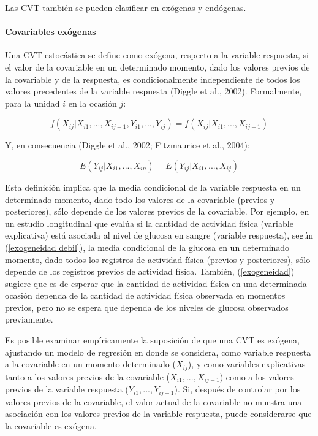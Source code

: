 \documentclass[spanish]{article}
\numberwithin{figure}{subsection}
\numberwithin{equation}{subsection}
\numberwithin{table}{subsection}
\begin{document}
Las CVT también se pueden clasificar en exógenas y endógenas.

\paragraph{Covariables exógenas} \mbox{}

Una CVT estocástica se define como exógena, respecto a la variable respuesta, si
el valor de la covariable en un determinado momento, dado los valores previos de
la covariable y de la respuesta, es condicionalmente independiente de todos los
valores precedentes de la variable respuesta (Diggle et al., 2002). Formalmente,
para la unidad $i$ en la ocasión $j$:  

\begin{equation}
	\label{exogeneidad}
	f(X_{ij}|X_{i1}, ..., X_{ij-1}, Y_{i1}, ..., Y_{ij}) =
	f(X_{ij}|X_{i1}, ..., X_{ij-1})
\end{equation}

Y, en consecuencia (Diggle et al., 2002; Fitzmaurice et al., 2004):

\begin{equation}
	\label{exogeneidad debil}
	E(Y_{ij}|X_{i1}, ..., X_{in}) = E(Y_{ij}|X_{i1}, ..., X_{ij})
\end{equation}

Esta definición implica que la media condicional de la variable respuesta en un
determinado momento, dado todo los valores de la covariable (previos y
posteriores), sólo depende de los valores previos de la covariable. Por ejemplo,
en un estudio longitudinal que evalúa si la cantidad de actividad física
(variable explicativa) está asociada al nivel de glucosa en sangre (variable
respuesta), según (\ref{exogeneidad debil}), la media condicional de la glucosa
en un determinado momento, dado todos los registros de actividad física (previos
y posteriores), sólo depende de los registros previos de actividad física.
También, (\ref{exogeneidad}) sugiere que es de esperar que la cantidad de
actividad física en una determinada ocasión dependa de la cantidad de actividad
física observada en momentos previos, pero no se espera que dependa de los niveles
de glucosa observados previamente.

Es posible examinar empíricamente la suposición de que una CVT es exógena,
ajustando un modelo de regresión en donde se considera, como variable respuesta
a la covariable en un momento determinado ($X_{ij}$), y como variables
explicativas tanto a los valores previos de la covariable ($X_{i1}, ...,
X_{ij-1}$) como a los valores previos de la variable respuesta ($Y_{i1}, ...,
Y_{ij-1}$). Si, después de controlar por los valores previos de la covariable,
el valor actual de la covariable no muestra una asociación con los valores
previos de la variable respuesta, puede considerarse que la covariable es
exógena.
\end{document}
